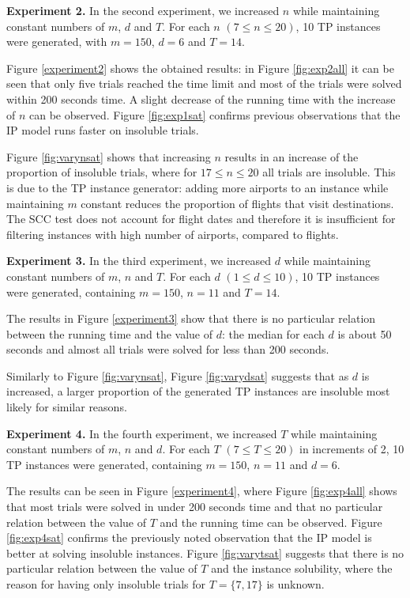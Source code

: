 \documentclass{mpaper}
\begin{document}
\textbf{Experiment 2.} In the second experiment, we increased $n$ while maintaining constant numbers of $m$, $d$ and $T$. For each $n$ $(7 \leq n \leq 20)$, 10 TP instances were generated, with $m = 150$, $d=6$ and $T=14$.

Figure \ref{experiment2} shows the obtained results: in Figure \ref{fig:exp2all} it can be seen that only five trials reached the time limit and most of the trials were solved within 200 seconds time. A slight decrease of the running time with the increase of $n$ can be observed. Figure \ref{fig:exp1sat} confirms previous observations that the IP model runs faster on insoluble trials.

Figure \ref{fig:varynsat} shows that increasing $n$ results in an increase of the proportion of insoluble trials, where for $17 \leq n \leq 20$ all trials are insoluble. This is due to the TP instance generator: adding more airports to an instance while maintaining $m$ constant reduces the proportion of flights that visit destinations. The SCC test does not account for flight dates and therefore it is insufficient for filtering instances with high number of airports, compared to flights. %

\textbf{Experiment 3.} In the third experiment, we increased $d$ while maintaining constant numbers of $m$, $n$ and $T$. For each $d$ $(1 \leq d \leq 10)$, 10 TP instances were generated, containing $m = 150$, $n=11$ and $T=14$.

The results in Figure \ref{experiment3} show that there is no particular relation between the running time and the value of $d$: the median for each $d$ is about 50 seconds and almost all trials were solved for less than 200 seconds.

Similarly to Figure \ref{fig:varynsat}, Figure \ref{fig:varydsat} suggests that as $d$ is increased, a larger proportion of the generated TP instances are insoluble most likely for similar reasons. 

\textbf{Experiment 4.} In the fourth experiment, we increased $T$ while maintaining constant numbers of $m$, $n$ and $d$. For each $T$ $(7 \leq T \leq 20)$ in increments of 2, 10 TP instances were generated, containing $m = 150$, $n=11$ and $d=6$.

The results can be seen in Figure \ref{experiment4}, where Figure \ref{fig:exp4all} shows that most trials were solved in under 200 seconds time and that no particular relation between the value of $T$ and the running time can be observed. Figure \ref{fig:exp4sat} confirms the previously noted observation that the IP model is better at solving insoluble instances. Figure \ref{fig:varytsat} suggests that there is no particular relation between the value of $T$ and the instance solubility, where the reason for having only insoluble trials for $T = \{7,17\}$ is unknown.
\end{document}
